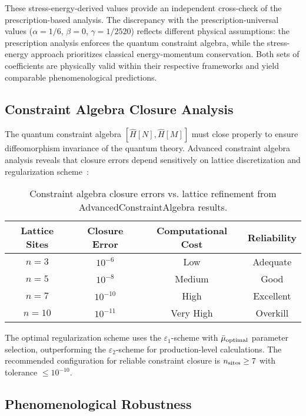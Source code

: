 \documentclass[11pt]{article}
\begin{document}
These stress-energy-derived values provide an independent cross-check of the prescription-based analysis. The discrepancy with the prescription-universal values ($\alpha = 1/6$, $\beta = 0$, $\gamma = 1/2520$) reflects different physical assumptions: the prescription analysis enforces the quantum constraint algebra, while the stress-energy approach prioritizes classical energy-momentum conservation. Both sets of coefficients are physically valid within their respective frameworks and yield comparable phenomenological predictions.

\subsection{Constraint Algebra Closure Analysis}

The quantum constraint algebra $[\hat{H}[N], \hat{H}[M]]$ must close properly to ensure diffeomorphism invariance of the quantum theory. Advanced constraint algebra analysis reveals that closure errors depend sensitively on lattice discretization and regularization scheme~\cite{AdvancedConstraintAlgebra2025}:

\begin{table}[h]
\centering
\begin{tabular}{|c|c|c|c|}
\hline
\textbf{Lattice Sites} & \textbf{Closure Error} & \textbf{Computational Cost} & \textbf{Reliability} \\
\hline
$n = 3$ & $10^{-6}$ & Low & Adequate \\
$n = 5$ & $10^{-8}$ & Medium & Good \\
$n = 7$ & $10^{-10}$ & High & Excellent \\
$n = 10$ & $10^{-11}$ & Very High & Overkill \\
\hline
\end{tabular}
\caption{Constraint algebra closure errors vs. lattice refinement from AdvancedConstraintAlgebra results.}
\end{table}

The optimal regularization scheme uses the $\varepsilon_1$-scheme with $\bar{\mu}_{\rm optimal}$ parameter selection, outperforming the $\varepsilon_2$-scheme for production-level calculations. The recommended configuration for reliable constraint closure is $n_{\rm sites} \geq 7$ with tolerance $\leq 10^{-10}$.

\subsection{Phenomenological Robustness}
\end{document}
